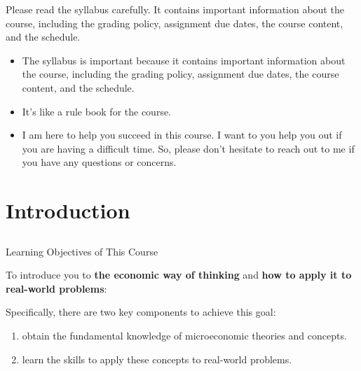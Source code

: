 \documentclass[
  letterpaper,
  DIV=11,
  numbers=noendperiod]{scrartcl}
\providecommand{\tightlist}{%
  \setlength{\itemsep}{0pt}\setlength{\parskip}{0pt}}\usepackage{longtable,booktabs,array}
\begin{document}
\begin{tcolorbox}[enhanced jigsaw, left=2mm, bottomrule=.15mm, rightrule=.15mm, colback=white, title=\textcolor{quarto-callout-important-color}{\faExclamation}\hspace{0.5em}{Syllabus is important!}, colbacktitle=quarto-callout-important-color!10!white, toprule=.15mm, colframe=quarto-callout-important-color-frame, titlerule=0mm, bottomtitle=1mm, toptitle=1mm, arc=.35mm, breakable, opacityback=0, leftrule=.75mm, opacitybacktitle=0.6, coltitle=black]

Please read the syllabus carefully. It contains important information
about the course, including the grading policy, assignment due dates,
the course content, and the schedule.

\end{tcolorbox}

\begin{itemize}
\item
  The syllabus is important because it contains important information
  about the course, including the grading policy, assignment due dates,
  the course content, and the schedule.
\item
  It's like a rule book for the course.
\item
  I am here to help you succeed in this course. I want to you help you
  out if you are having a difficult time. So, please don't hesitate to
  reach out to me if you have any questions or concerns.
\end{itemize}

\section{Introduction}\label{introduction}

\subsection{}\label{section}

Learning Objectives of This Course

To introduce you to \textbf{the economic way of thinking} and
\textbf{how to apply it to real-world problems}:

Specifically, there are two key components to achieve this goal:

\begin{enumerate}
\def\labelenumi{\arabic{enumi}.}
\tightlist
\item
  obtain the fundamental knowledge of microeconomic theories and
  concepts.
\item
  learn the skills to apply these concepts to real-world problems.
\end{enumerate}
\end{document}
